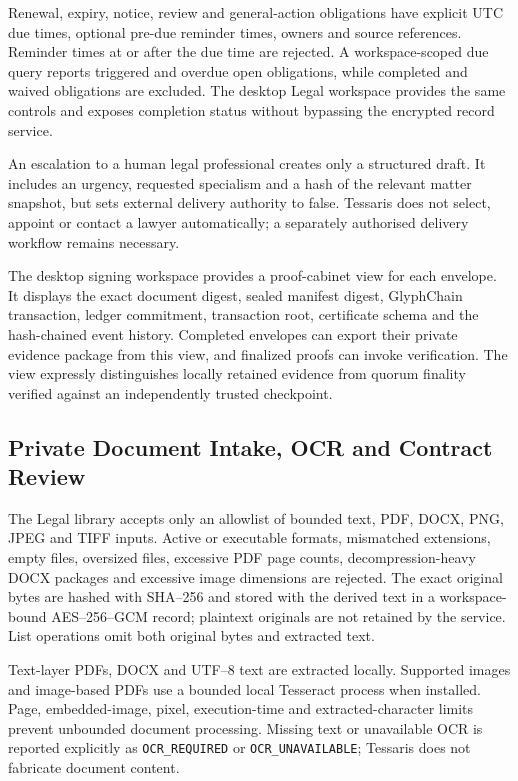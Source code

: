 Renewal, expiry, notice, review and general-action obligations have explicit
UTC due times, optional pre-due reminder times, owners and source references.
Reminder times at or after the due time are rejected.  A workspace-scoped due
query reports triggered and overdue open obligations, while completed and
waived obligations are excluded.  The desktop Legal workspace provides the
same controls and exposes completion status without bypassing the encrypted
record service.

An escalation to a human legal professional creates only a structured draft.
It includes an urgency, requested specialism and a hash of the relevant matter
snapshot, but sets external delivery authority to false.  Tessaris does not
select, appoint or contact a lawyer automatically; a separately authorised
delivery workflow remains necessary.

The desktop signing workspace provides a proof-cabinet view for each envelope.
It displays the exact document digest, sealed manifest digest, GlyphChain
transaction, ledger commitment, transaction root, certificate schema and the
hash-chained event history.  Completed envelopes can export their private
evidence package from this view, and finalized proofs can invoke verification.
The view expressly distinguishes locally retained evidence from quorum finality
verified against an independently trusted checkpoint.

\subsection{Private Document Intake, OCR and Contract Review}

The Legal library accepts only an allowlist of bounded text, PDF, DOCX, PNG,
JPEG and TIFF inputs.  Active or executable formats, mismatched extensions,
empty files, oversized files, excessive PDF page counts, decompression-heavy
DOCX packages and excessive image dimensions are rejected.  The exact original
bytes are hashed with SHA--256 and stored with the derived text in a
workspace-bound AES--256--GCM record; plaintext originals are not retained by
the service.  List operations omit both original bytes and extracted text.

Text-layer PDFs, DOCX and UTF--8 text are extracted locally.  Supported images
and image-based PDFs use a bounded local Tesseract process when installed.
Page, embedded-image, pixel, execution-time and extracted-character limits
prevent unbounded document processing.  Missing text or unavailable OCR is
reported explicitly as \texttt{OCR\_REQUIRED} or
\texttt{OCR\_UNAVAILABLE}; Tessaris does not fabricate document content.

